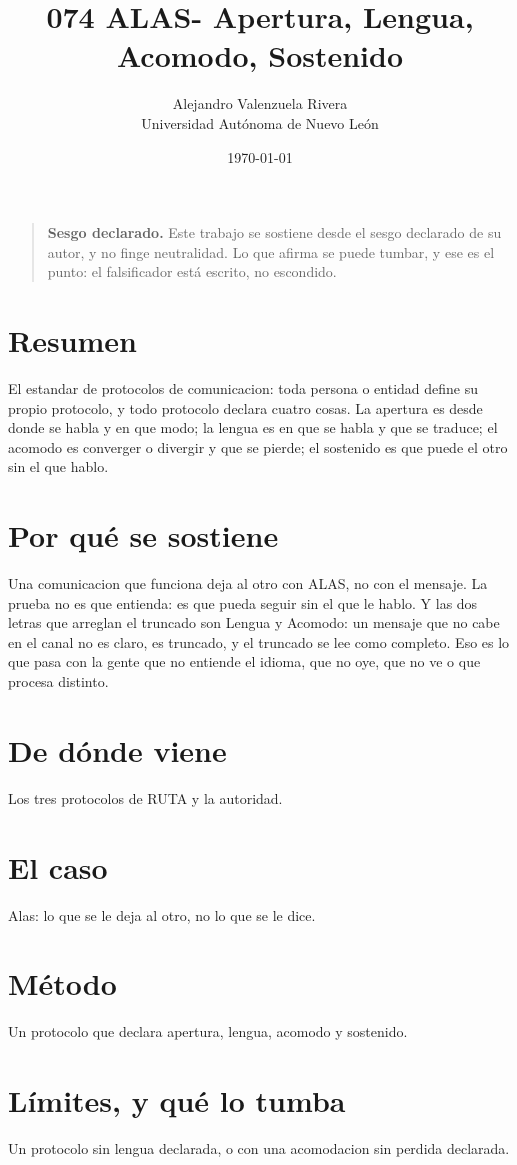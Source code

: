 \documentclass[11pt,a4paper]{article}
\title{074 ALAS- Apertura, Lengua, Acomodo, Sostenido}
\author{Alejandro Valenzuela Rivera\\\small Universidad Autónoma de Nuevo León}
\date{\today}
\begin{document}
\maketitle

\begin{quote}
\textbf{Sesgo declarado.} Este trabajo se sostiene desde el sesgo declarado de su autor, y no finge neutralidad. Lo que afirma se puede tumbar, y ese es el punto: el falsificador está escrito, no escondido.
\end{quote}

\section*{Resumen}
El estandar de protocolos de comunicacion: toda persona o entidad define su propio protocolo, y todo protocolo declara cuatro cosas. La apertura es desde donde se habla y en que modo; la lengua es en que se habla y que se traduce; el acomodo es converger o divergir y que se pierde; el sostenido es que puede el otro sin el que hablo.

\section{Por qué se sostiene}
Una comunicacion que funciona deja al otro con ALAS, no con el mensaje. La prueba no es que entienda: es que pueda seguir sin el que le hablo. Y las dos letras que arreglan el truncado son Lengua y Acomodo: un mensaje que no cabe en el canal no es claro, es truncado, y el truncado se lee como completo. Eso es lo que pasa con la gente que no entiende el idioma, que no oye, que no ve o que procesa distinto.

\section{De dónde viene}
Los tres protocolos de RUTA y la autoridad.

\section{El caso}
Alas: lo que se le deja al otro, no lo que se le dice.

\section{Método}
Un protocolo que declara apertura, lengua, acomodo y sostenido.

\section{Límites, y qué lo tumba}
Un protocolo sin lengua declarada, o con una acomodacion sin perdida declarada.
\end{document}
